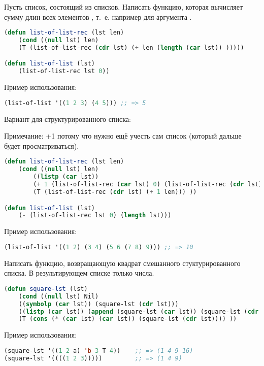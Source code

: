 \documentclass[a4paper,oneside,12pt]{extreport}
\begin{document}
\begin{task}
	Пусть  список, состоящий из списков.
	Написать функцию, которая вычисляет сумму длин всех элементов , т.~е. например для аргумента .

    \begin{lstlisting}[language=Lisp]
(defun list-of-list-rec (lst len)
	(cond ((null lst) len)
	(T (list-of-list-rec (cdr lst) (+ len (length (car lst)) )))))

(defun list-of-list (lst)
	(list-of-list-rec lst 0))
    \end{lstlisting}

    Пример использования:
    \begin{lstlisting}[language=Lisp]    
(list-of-list '((1 2 3) (4 5))) ;; => 5
    \end{lstlisting}

    Вариант для структурированного списка:

    Примечание: +1 потому что нужно ещё учесть сам список (который дальше будет просматриваться).
    \begin{lstlisting}[language=Lisp]
(defun list-of-list-rec (lst len)
    (cond ((null lst) len)
        ((listp (car lst)) 
        (+ 1 (list-of-list-rec (car lst) 0) (list-of-list-rec (cdr lst) len))) 
        (T (list-of-list-rec (cdr lst) (+ 1 len))) ))

(defun list-of-list (lst)
    (- (list-of-list-rec lst 0) (length lst)))
     \end{lstlisting}
        
    Пример использования:
    \begin{lstlisting}[language=Lisp]  
(list-of-list '((1 2) (3 4) (5 6 (7 8) 9))) ;; => 10
    \end{lstlisting}
\end{task}

\begin{task}
    Написать функцию, возвращающую 
    квадрат смешанного стуктурированного списка.
    В результирующем списке только числа.
    \begin{lstlisting}[language=Lisp]
(defun square-lst (lst) 
	(cond ((null lst) Nil)
	((symbolp (car lst)) (square-lst (cdr lst)))
	((listp (car lst)) (append (square-lst (car lst)) (square-lst (cdr lst))))
	(T (cons (* (car lst) (car lst)) (square-lst (cdr lst)))) )) 
    \end{lstlisting}

    Пример использования:
    \begin{lstlisting}[language=Lisp]    
(square-lst '((1 2 a) 'b 3 T 4))    ;; => (1 4 9 16)
(square-lst '((((1 2 3)))))         ;; => (1 4 9)
    \end{lstlisting}
\end{task}
\end{document}
